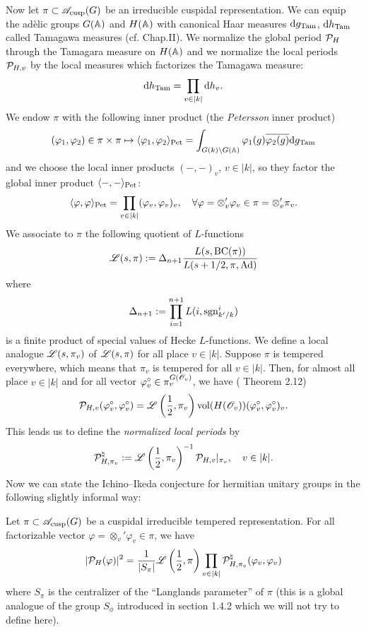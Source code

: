 Now let $\pi \subset \mathscr{A}_{\mathrm{cusp}}(G)$ be an irreducible cuspidal representation.
We can equip the ad\`elic groups $G(\mathbb{A})$ and $H(\mathbb{A})$ with canonical Haar measures $\mathrm{d} g_{\mathrm{Tam}}$, $\mathrm{d} h_{\mathrm{Tam}}$ called Tamagawa measures (cf. \cite{weil2012adeles} Chap.II).
We normalize the global period $\mathcal{P}_H$ through the Tamagara measure on $H(\mathbb{A})$ and we normalize the local periods $\mathcal{P}_{H, v}$ by the local measures which factorizes the Tamagawa measure:
\[
    \mathrm{d} h_{\mathrm{Tam}} = \prod_{v \in |k|} \mathrm{d} h_v.
\]
We endow $\pi$ with the following inner product (the \emph{Petersson} inner product)
\[
    (\varphi_1, \varphi_2) \in \pi \times \pi \mapsto \langle \varphi_1, \varphi_2 \rangle_{\mathrm{Pet}} = \int_{G(k) \backslash G(\mathbb{A})} \varphi_1(g) \overline{\varphi_2(g)} \mathrm{d} g_{\mathrm{Tam}}
\]
and we choose the local inner products $(-, -)_v$, $v \in |k|$, so they factor the global inner product $\langle-, -\rangle_{\mathrm{Pet}}$:
\[
    \langle \varphi, \varphi \rangle_{\mathrm{Pet}} = \prod_{v \in |k|} (\varphi_v, \varphi_v)_v, \quad \forall \varphi = \otimes_{v}' \varphi_v \in \pi = \otimes_v' \pi_v.
\]
We associate to $\pi$ the following quotient of $L$-functions
\[
    \mathscr{L}(s, \pi) := \Delta_{n+1} \frac{L(s, \mathrm{BC}(\pi))}{L(s + 1/2, \pi, \mathrm{Ad})}
\]
where
\[
    \Delta_{n+1} := \prod_{i=1}^{n+1} L(i, \mathrm{sgn}_{k'/k}^i)
\]
is a finite product of special values of Hecke $L$-functions.
We define a local analogue $\mathscr{L}(s, \pi_v)$ of $\mathscr{L}(s, \pi)$ for all place $v \in |k|$.
Suppose $\pi$ is tempered everywhere, which means that $\pi_v$ is tempered for all $v \in |k|$.
Then, for almost all place $v \in |k|$ and for all vector $\varphi_v^\circ \in \pi_v^{G(\mathscr{O}_v)}$, we have (\cite{harris2014refined} Theorem 2.12)
\[
    \mathcal{P}_{H, v}(\varphi_v^\circ, \varphi_v^\circ) = \mathscr{L}\left(\frac{1}{2}, \pi_v \right) \mathrm{vol}(H(\mathscr{O}_v)) (\varphi_v^\circ, \varphi_v^\circ)_v.
\]
This leads us to define the \emph{normalized local periods} by
\[
    \mathcal{P}_{H, \pi_v}^{\natural} := \mathscr{L}\left(\frac{1}{2}, \pi_v\right)^{-1} \mathcal{P}_{H, v}|_{\pi_v}, \quad v\in |k|.
\]
Now we can state the Ichino--Ikeda conjecture for hermitian unitary groups in the following slightly informal way:
\begin{conjecture}
\label{conj:ichinoikeda}
Let $\pi \subset \mathscr{A}_{\mathrm{cusp}}(G)$ be a cuspidal irreducible tempered representation.
For all factorizable vector $\varphi = \otimes_v' \varphi_v\in\pi$, we have
\[
    |\mathcal{P}_H(\varphi)|^2 = \frac{1}{|S_\pi|} \mathscr{L}\left(\frac{1}{2}, \pi\right) \prod_{v \in |k|} \mathcal{P}_{H, \pi_v}^\natural(\varphi_v, \varphi_v)
\]
where $S_\pi$ is the centralizer of the ``Langlands parameter'' of $\pi$ (this is a global analogue of the group $S_\phi$ introduced in section 1.4.2 which we will not try to define here).
\end{conjecture}

